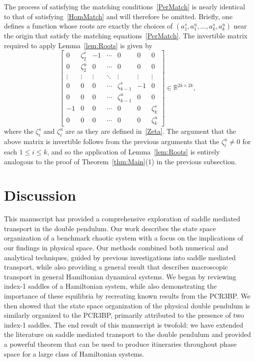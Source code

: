 \documentclass[11pt]{article}
\newcommand{\R}{\mathbb{R}}
\numberwithin{equation}{section}
\theoremstyle{plain}
\begin{document}
The process of satisfying the matching conditions~\eqref{PerMatch} is nearly identical to that of satisfying~\eqref{HomMatch} and will therefore be omitted. Briefly, one defines a function whose roots are exactly the choices of $(a^s_1,a^u_1,\dots,a^s_k,a^u_k)$ near the origin that satisfy the matching equations~\eqref{PerMatch}. The invertible matrix required to apply Lemma~\ref{lem:Roots} is given by
\begin{equation}
	\begin{bmatrix}
			0 & \zeta^s_2 & -1 & \cdots & 0 & 0 & 0 \\ 0 & \zeta^u_2 & 0 & \cdots & 0 & 0 & 0 \\ 
			\vdots & \vdots & \vdots & \ddots & \vdots & \vdots & \vdots \\
			0 & 0 & 0 & \cdots & \zeta^s_{k-1} & -1 & 0\\
			0 & 0 & 0 & \cdots &\zeta^u_{k-1} & 0 & 0\\
			-1 & 0 & 0 & \cdots & 0 & 0 & \zeta^s_k \\
			0 & 0 & 0 & \cdots & 0 & 0 & \zeta^u_k
		\end{bmatrix} \in \R^{2k\times 2k},	
\end{equation}  
where the $\zeta^s_i$ and $\zeta^u_i$ are as they are defined in~\eqref{Zeta}. The argument that the above matrix is invertible follows from the previous arguments that the $\zeta^u_i \neq 0$ for each $1 \leq i \leq k$, and so the application of Lemma~\ref{lem:Roots} is entirely analogous to the proof of Theorem~\ref{thm:Main}(1) in the previous subsection. 



\clearpage
\section{Discussion}\label{sec:Conclusion}

This manuscript has provided a comprehensive exploration of saddle mediated transport in the double pendulum. Our work describes the state space organization of a benchmark chaotic system with a focus on the implications of our findings in physical space. Our methods combined both numerical and analytical techniques, guided by previous investigations into saddle mediated transport, while also providing a general result that describes macroscopic transport in general Hamiltonian dynamical systems. We began by reviewing index-1 saddles of a Hamiltonian system, while also demonstrating the importance of these equilibria by recreating known results from the PCR3BP. We then showed that the state space organization of the physical double pendulum is similarly organized to the PCR3BP, primarily attributed to the presence of two index-1 saddles. The end result of this manuscript is twofold: we have extended the literature on saddle mediated transport to the double pendulum and provided a powerful theorem that can be used to produce itineraries throughout phase space for a large class of Hamiltonian systems. 
\end{document}

